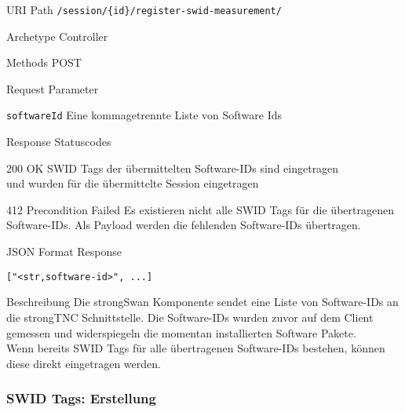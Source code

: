 \documentclass[10pt,a4paper]{scrartcl}
\begin{document}
\begin{mdframed}[style=def]
\begin{description*}
	\item[URI Path] \texttt{/session/\{id\}/register-swid-measurement/}
	\item[Archetype] Controller
	\item[Methods] POST
	\item[Request Parameter] \hfill
	\begin{description*}
		\item[\texttt{softwareId}] Eine kommagetrennte Liste von Software Ids
	\end{description*}
	\item[Response Statuscodes] \hfill
		\begin{description*}
			\item[200 OK] SWID Tags der übermittelten Software-IDs sind eingetragen \\
			und wurden für die übermittelte Session eingetragen
			\item[412 Precondition Failed] Es existieren nicht alle SWID Tags für die
				übertragenen Software-IDs. Als Payload werden die fehlenden Software-IDs
				übertragen.
		\end{description*}
	\item[JSON Format Response] \hfill
\begin{lstlisting}
["<str,software-id>", ...]
\end{lstlisting}
	\item[Beschreibung] Die strongSwan Komponente sendet eine Liste von
		Software-IDs an die strongTNC Schnittstelle. Die Software-IDs wurden zuvor
		auf dem Client gemessen und widerspiegeln die momentan installierten
		Software Pakete.\\
		Wenn bereits SWID Tags für alle übertragenen Software-IDs bestehen, können
		diese direkt eingetragen werden.
\end{description*}
\end{mdframed}


\subsubsection{SWID Tags: Erstellung}
\end{document}
